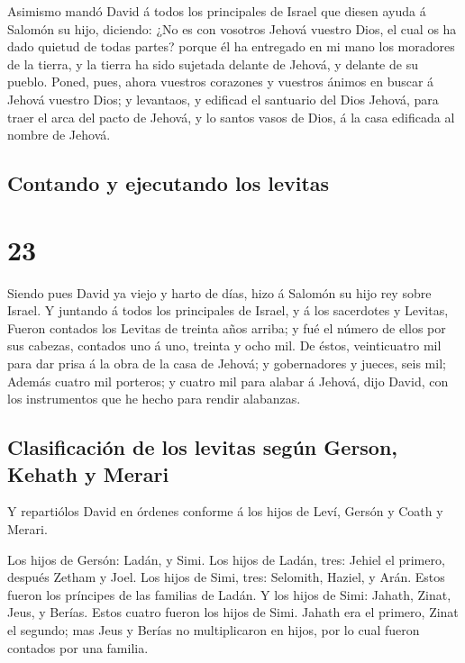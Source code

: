  Asimismo mandó David á todos los principales de Israel
que diesen ayuda á Salomón su hijo, diciendo:  ¿No es con
vosotros Jehová vuestro Dios, el cual os ha dado quietud de todas
partes? porque él ha entregado en mi mano los moradores de la tierra, y
la tierra ha sido sujetada delante de Jehová, y delante de su pueblo.
 Poned, pues, ahora vuestros corazones y vuestros ánimos
en buscar á Jehová vuestro Dios; y levantaos, y edificad el santuario
del Dios Jehová, para traer el arca del pacto de Jehová, y lo santos
vasos de Dios, á la casa edificada al nombre de Jehová.

\hypertarget{contando-y-ejecutando-los-levitas}{%
\subsection{Contando y ejecutando los
levitas}\label{contando-y-ejecutando-los-levitas}}

\hypertarget{section-13-23}{%
\section{23}\label{section-13-23}}

 Siendo pues David ya viejo y harto de días, hizo á
Salomón su hijo rey sobre Israel.  Y juntando á todos los
principales de Israel, y á los sacerdotes y Levitas, 
Fueron contados los Levitas de treinta años arriba; y fué el número de
ellos por sus cabezas, contados uno á uno, treinta y ocho mil.
 De éstos, veinticuatro mil para dar prisa á la obra de la
casa de Jehová; y gobernadores y jueces, seis mil;  Además
cuatro mil porteros; y cuatro mil para alabar á Jehová, dijo David, con
los instrumentos que he hecho para rendir alabanzas.

\hypertarget{clasificaciuxf3n-de-los-levitas-seguxfan-gerson-kehath-y-merari}{%
\subsection{Clasificación de los levitas según Gerson, Kehath y
Merari}\label{clasificaciuxf3n-de-los-levitas-seguxfan-gerson-kehath-y-merari}}

 Y repartiólos David en órdenes conforme á los hijos de
Leví, Gersón y Coath y Merari.

 Los hijos de Gersón: Ladán, y Simi.  Los
hijos de Ladán, tres: Jehiel el primero, después Zetham y Joel.
 Los hijos de Simi, tres: Selomith, Haziel, y Arán. Estos
fueron los príncipes de las familias de Ladán.  Y los
hijos de Simi: Jahath, Zinat, Jeus, y Berías. Estos cuatro fueron los
hijos de Simi.  Jahath era el primero, Zinat el segundo;
mas Jeus y Berías no multiplicaron en hijos, por lo cual fueron contados
por una familia.

